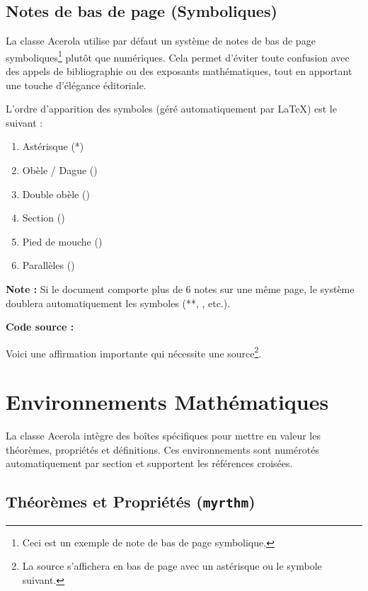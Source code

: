 \subsection{Notes de bas de page (Symboliques)}

La classe Acerola utilise par défaut un système de notes de bas de page symboliques\footnote{Ceci est un exemple de note de bas de page symbolique.} plutôt que numériques. Cela permet d'éviter toute confusion avec des appels de bibliographie ou des exposants mathématiques, tout en apportant une touche d'élégance éditoriale.

L'ordre d'apparition des symboles (géré automatiquement par \LaTeX) est le suivant :

\begin{enumerate}
    \item Astérisque (*)
    \item Obèle / Dague (\textdagger)
    \item Double obèle (\textdaggerdbl)
    \item Section (\textsection)
    \item Pied de mouche (\textparagraph)
    \item Parallèles (\textbardbl)
\end{enumerate}

\textbf{Note :} Si le document comporte plus de 6 notes sur une même page, le système doublera automatiquement les symboles (**, \textdagger\textdagger, etc.).

\textbf{Code source :}
\begin{texblock}
Voici une affirmation importante qui nécessite une source\footnote{La source s'affichera en bas de page avec un astérisque ou le symbole suivant.}.
\end{texblock}

\section{Environnements Mathématiques}

La classe Acerola intègre des boîtes spécifiques pour mettre en valeur les théorèmes, propriétés et définitions. Ces environnements sont numérotés automatiquement par section et supportent les références croisées.

\subsection{Théorèmes et Propriétés (\texttt{myrthm})}

